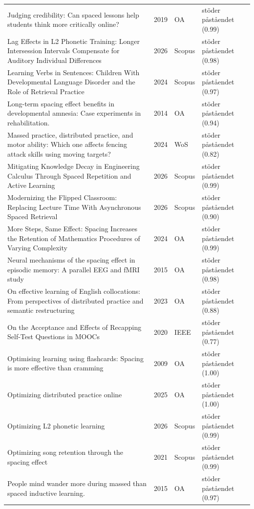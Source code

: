 \begin{longtable}{@{}%
  >{\raggedright\arraybackslash}p{}c%
  >{\raggedright\arraybackslash}p{}%
  >{\raggedright\arraybackslash}p{}@{}}
Judging credibility: Can spaced lessons help students think more critically online? & 2019 & OA & stöder påståendet (0.99) \\
Lag Effects in L2 Phonetic Training: Longer Intersession Intervals Compensate for Auditory Individual Differences & 2026 & Scopus & stöder påståendet (0.98) \\
Learning Verbs in Sentences: Children With Developmental Language Disorder and the Role of Retrieval Practice & 2024 & Scopus & stöder påståendet (0.97) \\
Long-term spacing effect benefits in developmental amnesia: Case experiments in rehabilitation. & 2014 & OA & stöder påståendet (0.94) \\
Massed practice, distributed practice, and motor ability: Which one affects fencing attack skills using moving targets? & 2024 & WoS & stöder påståendet (0.82) \\
Mitigating Knowledge Decay in Engineering Calculus Through Spaced Repetition and Active Learning & 2026 & Scopus & stöder påståendet (0.99) \\
Modernizing the Flipped Classroom: Replacing Lecture Time With Asynchronous Spaced Retrieval & 2026 & Scopus & stöder påståendet (0.90) \\
More Steps, Same Effect: Spacing Increases the Retention of Mathematics Procedures of Varying Complexity & 2024 & OA & stöder påståendet (0.99) \\
Neural mechanisms of the spacing effect in episodic memory: A parallel EEG and fMRI study & 2015 & OA & stöder påståendet (0.98) \\
On effective learning of English collocations: From perspectives of distributed practice and semantic restructuring & 2023 & OA & stöder påståendet (0.88) \\
On the Acceptance and Effects of Recapping Self-Test Questions in MOOCs & 2020 & IEEE & stöder påståendet (0.77) \\
Optimising learning using flashcards: Spacing is more effective than cramming & 2009 & OA & stöder påståendet (1.00) \\
Optimizing distributed practice online & 2025 & OA & stöder påståendet (1.00) \\
Optimizing L2 phonetic learning & 2026 & Scopus & stöder påståendet (0.99) \\
Optimizing song retention through the spacing effect & 2021 & Scopus & stöder påståendet (0.99) \\
People mind wander more during massed than spaced inductive learning. & 2015 & OA & stöder påståendet (0.97) \\

\end{longtable}
